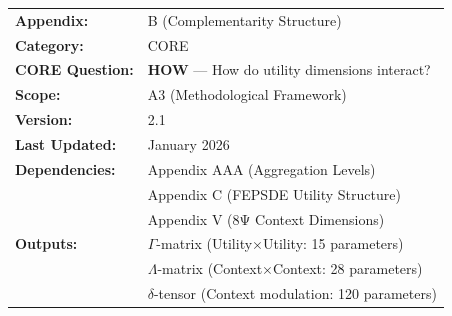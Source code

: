 %
% 
%
%
%


\begin{tcolorbox}[colback=red!5!white, colframe=red!75!black, 
    title=\textbf{CORE Appendix: Complementarity Structure}]

\begin{tabular}{@{}ll@{}}
\textbf{Appendix:} & B (Complementarity Structure) \\
\textbf{Category:} & CORE \\
\textbf{CORE Question:} & \textbf{HOW} --- How do utility dimensions interact? \\
\textbf{Scope:} & A3 (Methodological Framework) \\
\textbf{Version:} & 2.1 \\
\textbf{Last Updated:} & January 2026 \\
\textbf{Dependencies:} & Appendix AAA (Aggregation Levels) \\
 & Appendix C (FEPSDE Utility Structure) \\
 & Appendix V (8Ψ Context Dimensions) \\
\textbf{Outputs:} & $\Gamma$-matrix (Utility$\times$Utility: 15 parameters) \\
 & $\Lambda$-matrix (Context$\times$Context: 28 parameters) \\
 & $\delta$-tensor (Context modulation: 120 parameters) \\
\end{tabular}

\end{tcolorbox}


